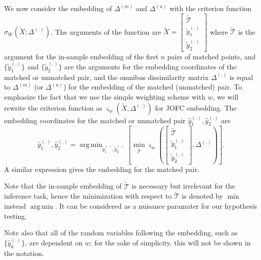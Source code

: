 \documentclass[12pt]{article} %
\DeclareMathOperator*{\argmin}{arg\,min}
\newenvironment{remark}[1][Remark]{\begin{trivlist}
\item[\hskip \labelsep {\bfseries #1}]}{\end{trivlist}}
\begin{document}


 We now consider the embedding of $\Delta^{(m)}$ and $\Delta^{(u)}$ with the criterion function  $\sigma_W(\widetilde{X}; \Delta^{(.)})$. The arguments of the function are  $\widetilde{X}= \left[
\begin{array}{c}
{\widetilde{\mathcal{T}}} \\
\widetilde{y}_{1}^{(.)} \\
\widetilde{y}_{2}^{(.)}
\end {array}
\right]$ where ${\widetilde{\mathcal{T}}}$ is the argument for the in-sample embedding of the first $n$ pairs of matched points, and
 $\{\widetilde{y}_{1}^{(.)} \}$ and $\{\widetilde{y}_{2}^{(.)} \}$ are the arguments for the embedding coordinates of the matched  or unmatched pair,
and the omnibus dissimilarity matrix $\Delta^{(.)}$ is equal to  $\Delta^{(m)}$  (or $\Delta^{(u)}$) for the embedding of the  matched (unmatched) pair. To emphasize the fact that we use the simple weighting scheme with $w$, we will rewrite the criterion function as  $\varsigma_w(\widetilde{X},\Delta^{(.)})$ for JOFC embedding. The embedding coordinates for the matched or unmatched pair  ${\hat{y}_{1}^{(.)},\hat{y}_{2}^{(.)}}$ are
 \[
{\hat{y}_{1}^{(.)},\hat{y}_{2}^{(.)}}
=\argmin_{\widetilde{y}_{1}^{(.)}, \widetilde{y}_{2}^{(.)}}\left[\min_{\widetilde{\mathcal{T}}}
{\varsigma_w\left(
\left[
\begin{array}{c}
{\widetilde{\mathcal{T}}} \\
\widetilde{y}_{1}^{(.)} \\
\widetilde{y}_{2}^{(.)}
\end {array}
\right]
,
\Delta^{(.)}
\right)
}
\right].
\]
A similar expression gives the embedding for the matched pair.
\begin{remark}
 Note that the in-sample embedding of $\widetilde{\mathcal{T}}$ is necessary but irrelevant for the inference task, hence the minimization with respect to $\widetilde{\mathcal{T}}$ is denoted by  $\min$ instead $\argmin$. It can be considered as a nuisance paramater for our hypothesis testing.
\end{remark}
\begin{remark}
 Note also that  all of the random variables following the embedding, such as $\{\hat{y}_{k}^{(.)}\}\!$,  are dependent on $w$; for the sake of simplicity, this will not be shown in the notation. 
\end{remark}
\end{document}
